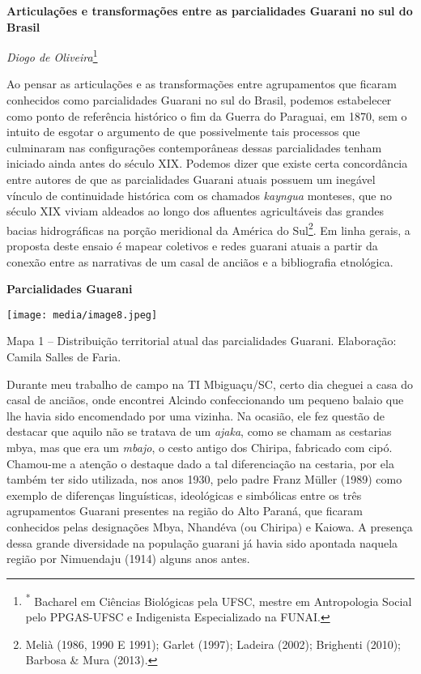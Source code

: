 \textbf{Articulações e transformações entre as parcialidades Guarani no
sul do Brasil}

\emph{Diogo de Oliveira}\footnote{\textsuperscript{*} Bacharel em
  Ciências Biológicas pela UFSC, mestre em Antropologia Social pelo
  PPGAS-UFSC e Indigenista Especializado na FUNAI.}

Ao pensar as articulações e as transformações entre agrupamentos que
ficaram conhecidos como parcialidades Guarani no sul do Brasil, podemos
estabelecer como ponto de referência histórico o fim da Guerra do
Paraguai, em 1870, sem o intuito de esgotar o argumento de que
possivelmente tais processos que culminaram nas configurações
contemporâneas dessas parcialidades tenham iniciado ainda antes do
século XIX. Podemos dizer que existe certa concordância entre autores de
que as parcialidades Guarani atuais possuem um inegável vínculo de
continuidade histórica com os chamados \emph{kayngua} monteses, que no
século XIX viviam aldeados ao longo dos afluentes agricultáveis das
grandes bacias hidrográficas na porção meridional da América do
Sul\footnote{Melià (1986, 1990 E 1991); Garlet (1997); Ladeira (2002);
  Brighenti (2010); Barbosa \& Mura (2013).}. Em linha gerais, a
proposta deste ensaio é mapear coletivos e redes guarani atuais a partir
da conexão entre as narrativas de um casal de anciãos e a bibliografia
etnológica.

\textbf{Parcialidades Guarani}

\texttt{[image: media/image8.jpeg]}

Mapa 1 -- Distribuição territorial atual das parcialidades Guarani.
Elaboração: Camila Salles de Faria.

Durante meu trabalho de campo na TI Mbiguaçu/SC, certo dia cheguei a
casa do casal de anciãos, onde encontrei Alcindo confeccionando um
pequeno balaio que lhe havia sido encomendado por uma vizinha. Na
ocasião, ele fez questão de destacar que aquilo não se tratava de um
\emph{ajaka}, como se chamam as cestarias mbya, mas que era um
\emph{mbajo}, o cesto antigo dos Chiripa, fabricado com cipó. Chamou-me
a atenção o destaque dado a tal diferenciação na cestaria, por ela
também ter sido utilizada, nos anos 1930, pelo padre Franz Müller (1989)
como exemplo de diferenças linguísticas, ideológicas e simbólicas entre
os três agrupamentos Guarani presentes na região do Alto Paraná, que
ficaram conhecidos pelas designações Mbya, Nhandéva (ou Chiripa) e
Kaiowa. A presença dessa grande diversidade na população guarani já
havia sido apontada naquela região por Nimuendaju (1914) alguns anos
antes.

